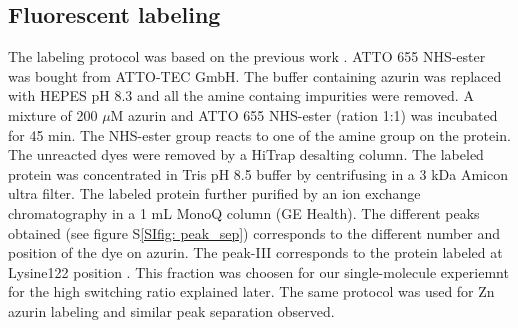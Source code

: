 \documentclass[journal=jacsat,manuscript=article]{achemso}
\begin{document}
\subsection{Fluorescent labeling}
The labeling protocol was based on the previous work \cite{nicolardi2012topdown}. ATTO 655 NHS-ester was bought from ATTO-TEC GmbH. The buffer containing azurin was replaced with HEPES pH 8.3 and all the amine containg impurities were removed. A mixture of 200 $\mu$M azurin and ATTO 655 NHS-ester (ration 1:1) was incubated for 45 min. The NHS-ester group reacts to one of the amine group on the protein. The unreacted dyes were removed by a HiTrap desalting column. The labeled protein was concentrated in Tris pH 8.5 buffer by centrifusing in a 3 kDa Amicon ultra filter. The labeled protein further purified by an ion exchange chromatography in a 1 mL MonoQ column (GE Health). The different peaks obtained (see figure S\ref{SIfig: peak_sep}) corresponds to the different number and position of the dye on azurin. The peak-III corresponds to the protein labeled at Lysine122 position \cite{nicolardi2012topdown}. This fraction was choosen for our single-molecule experiemnt for the high switching ratio explained later. The same protocol was used for Zn azurin labeling and similar peak separation observed.

\end{document}
